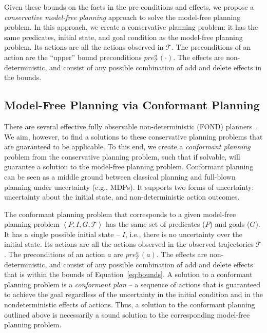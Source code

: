 \documentclass[letterpaper]{article}
\newcommand{\tuple}[1]{\ensuremath{\left \langle #1 \right \rangle }}
\begin{document}
Given these bounds on the facts in the pre-conditions and effects, we propose a {\em conservative model-free planning} approach to solve the model-free planning problem. In this approach, we create a conservative planning problem: it has the same predicates, initial state, and goal condition as the model-free planning problem. Its actions are all the actions observed in $\mathcal{T}$. The preconditions of an action are the ``upper'' bound preconditions $pre_\mathcal{T}^u(\cdot)$. The effects are non-deterministic, and consist of any possible combination of add and delete effects in the bounds. 

\subsection{Model-Free Planning via Conformant Planning}
There are several effective fully observable non-deterministic (FOND) planners~\cite{cimatti2003weak}. We aim, however, to find a  solutions to these conservative planning problems that are guaranteed to be applicable. To this end, we create a {\em conformant planning} problem from the conservative planning problem, such that if solvable, will guarantee a solution to the model-free planning problem. Conformant planning can be seen as a middle ground between classical planning and full-blown planning under uncertainty (e.g., MDPs). It supports two forms of uncertainty: uncertainty about the initial state, and non-deterministic action outcomes. %





The conformant planning problem that corresponds to a given model-free planning problem $\tuple{P,I,G, \mathcal{T}}$ has the same set of predicates ($P$) and goals ($G$). It has a single possible initial state -- $I$, i.e., there is no uncertainty over the initial state. Its actions are all the actions observed in the observed trajectories $\mathcal{T}$. The preconditions of an action $a$ are $pre_\mathcal{T}^u(a)$. The effects are non-deterministic, and consist of any possible combination of 
add and delete effects that is within the bounds of Equation~\ref{eq:bounds}. A solution to a conformant planning problem is a {\em conformant plan} -- a sequence of actions that is guaranteed to achieve the goal regardless of the uncertainty in the initial condition and in the nondeterministic effects of actions. Thus, a solution to the conformant planning outlined above is necessarily a sound solution to the corresponding model-free planning problem. 
\end{document}
